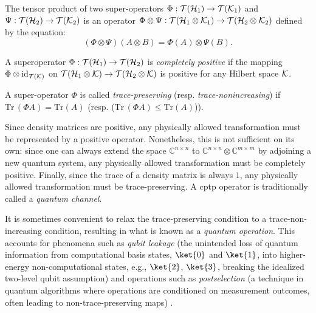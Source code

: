 \begin{definition}
  The tensor product of two super-operators 
  $\Phi: \mathcal{T}(\mathcal{H}_1) \rightarrow \mathcal{T}(\mathcal{K}_1) $ 
  and
  $\Psi : \mathcal{T}(\mathcal{H}_2) \rightarrow \mathcal{T}(\mathcal{K}_2)$ 
  is an operator 
  $ \Phi \otimes \Psi:  \mathcal{T}(\mathcal{H}_1 \otimes \mathcal{K}_1) \rightarrow \mathcal{T}(\mathcal{H}_2 \otimes \mathcal{K}_2)$ 
  defined by the equation:
\begin{equation*}
  (\Phi \otimes \Psi)(A \otimes B) = \Phi (A) \otimes \Psi(B).
\end{equation*}
\end{definition}

\begin{definition} \label{def:completely_positive_superoperator}
  A superoperator $ \Phi : \mathcal{T}(\mathcal{H}_1) \to \mathcal{T}(\mathcal{H}_2)$ is \emph{completely positive} if the mapping 
$\Phi \otimes \mathrm{id}_{\mathcal{T}(\mathcal{K})}$ on $\mathcal{T}(\mathcal{H}_1 \otimes \mathcal{K}) \to \mathcal{T}(\mathcal{H}_2 \otimes \mathcal{K}) $ is positive for any Hilbert space $\mathcal{K}$.
\end{definition}


\begin{definition} \label{def:trace_preserving_superoperator}
  A super-operator $\Phi$ is called \emph{trace-preserving} (resp. \emph{trace-nonincreasing}) if $\text{Tr} \hspace{2pt} (\Phi A)= \text{Tr} (A) $ (resp. ($\text{Tr} \hspace{2pt} (\Phi A)\leq \text{Tr} (A)$)).
\end{definition}

Since density matrices are positive, any physically allowed transformation must be represented by a positive operator. Nonetheless, this is not sufficient on its own: since one can always extend the space $\mathbb{C}^{n \times n}$ to  $\mathbb{C}^{n \times n} \otimes \mathbb{C}^{m \times m} $ by adjoining a new quantum system, any physically allowed transformation must be completely positive. Finally, since the trace of a density matrix is always $1$, any physically allowed transformation must be trace-preserving. A \acrfull{cptp} operator is traditionally called a \emph{quantum channel}.


It is sometimes convenient to relax the trace-preserving condition to a trace-non-increasing condition, resulting in what is known as a \emph{quantum operation}. This accounts for phenomena such as \emph{qubit leakage} (the unintended loss of quantum information from computational basis states, $\ket{0}$ and $\ket{1}$, into higher-energy non-computational states, e.g., $\ket{2}$, $\ket{3}$, breaking the idealized two-level qubit assumption) and operations such as \emph{postselection} (a technique in quantum algorithms where operations are conditioned on measurement outcomes, often leading to non-trace-preserving maps) \cite{Yu_trace_non_inc}.


